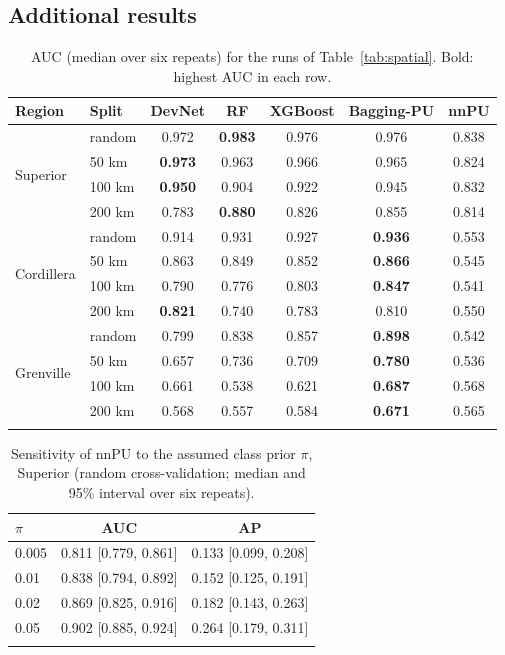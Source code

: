 \documentclass[pdflatex,sn-apa]{sn-jnl}
\begin{document}
\begin{appendices}

\section{Additional results}\label{app:full}

\begin{table}[!h]
\caption{AUC (median over six repeats) for the runs of Table~\ref{tab:spatial}. Bold: highest AUC in each row.}\label{tab:spatial-auc}
\footnotesize
\setlength{\tabcolsep}{3pt}
\begin{tabular*}{\textwidth}{@{\extracolsep\fill}llccccc}
\toprule
Region & Split & DevNet & RF & XGBoost & Bagging-PU & nnPU \\
\midrule
\multirow{4}{*}{Superior} & random & 0.972 & \textbf{0.983} & 0.976 & 0.976 & 0.838 \\
 & 50 km & \textbf{0.973} & 0.963 & 0.966 & 0.965 & 0.824 \\
 & 100 km & \textbf{0.950} & 0.904 & 0.922 & 0.945 & 0.832 \\
 & 200 km & 0.783 & \textbf{0.880} & 0.826 & 0.855 & 0.814 \\
\midrule
\multirow{4}{*}{Cordillera} & random & 0.914 & 0.931 & 0.927 & \textbf{0.936} & 0.553 \\
 & 50 km & 0.863 & 0.849 & 0.852 & \textbf{0.866} & 0.545 \\
 & 100 km & 0.790 & 0.776 & 0.803 & \textbf{0.847} & 0.541 \\
 & 200 km & \textbf{0.821} & 0.740 & 0.783 & 0.810 & 0.550 \\
\midrule
\multirow{4}{*}{Grenville} & random & 0.799 & 0.838 & 0.857 & \textbf{0.898} & 0.542 \\
 & 50 km & 0.657 & 0.736 & 0.709 & \textbf{0.780} & 0.536 \\
 & 100 km & 0.661 & 0.538 & 0.621 & \textbf{0.687} & 0.568 \\
 & 200 km & 0.568 & 0.557 & 0.584 & \textbf{0.671} & 0.565 \\
\botrule
\end{tabular*}
\end{table}

\begin{table}[!h]
\caption{Sensitivity of nnPU to the assumed class prior $\pi$, Superior (random cross-validation; median and 95\% interval over six repeats).}\label{tab:prior}
\footnotesize
\begin{tabular*}{0.6\textwidth}{@{\extracolsep\fill}lcc}
\toprule
$\pi$ & AUC & AP \\
\midrule
0.005 & 0.811 [0.779, 0.861] & 0.133 [0.099, 0.208] \\
0.01 & 0.838 [0.794, 0.892] & 0.152 [0.125, 0.191] \\
0.02 & 0.869 [0.825, 0.916] & 0.182 [0.143, 0.263] \\
0.05 & 0.902 [0.885, 0.924] & 0.264 [0.179, 0.311] \\
\botrule
\end{tabular*}
\end{table}


\end{appendices}
\end{document}
